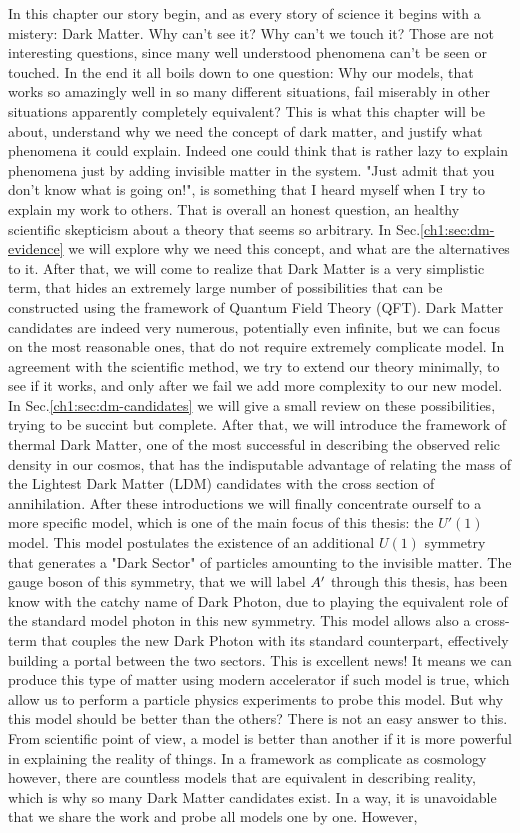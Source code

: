 In this chapter our story begin, and as every story of science it begins with a mistery: Dark Matter. Why can't see it? Why can't we touch it? Those are not interesting questions, since many well understood phenomena can't be seen or touched. In the end it all boils down to one question: Why our models, that works so amazingly well in so many different situations, fail miserably in other situations apparently completely equivalent? This is what this chapter will be about, understand why we need the concept of dark matter, and justify what phenomena it could explain. Indeed one could think that is rather lazy to explain phenomena just by adding invisible matter in the system. "Just admit that you don't know what is going on!", is something that I heard myself when I try to explain my work to others. That is overall an honest question, an healthy scientific skepticism  about a theory that seems so arbitrary. In Sec.\ref{ch1:sec:dm-evidence} we will explore why we need this concept, and what are the alternatives to it. After that, we will come to realize that Dark Matter is a very simplistic term, that hides an extremely large number of possibilities that can be constructed using the framework of Quantum Field Theory (QFT). Dark Matter candidates are indeed very numerous, potentially even infinite, but we can focus on the most reasonable ones, that do not require extremely complicate model. In agreement with the scientific method, we try to extend our theory minimally, to see if it works, and only after we fail we add more complexity to our new model. In Sec.\ref{ch1:sec:dm-candidates} we will give a small review on these possibilities, trying to be succint but complete. After that, we will introduce the framework of thermal Dark Matter, one of the most successful in describing the observed relic density in our cosmos, that has the indisputable advantage of relating the mass of the Lightest Dark Matter (LDM) candidates with the cross section of annihilation. After these introductions we will finally concentrate ourself to a more specific model, which is one of the main focus of this thesis: the $U'(1)$ model. This model postulates the existence of an additional $U(1)$ symmetry that generates a "Dark Sector" of particles amounting to the invisible matter. The gauge boson of this symmetry, that we will label $A'$ through this thesis, has been know with the catchy name of Dark Photon, due to playing the equivalent role of the standard model photon in this new symmetry. This model allows also a cross-term that couples the new Dark Photon with its standard counterpart, effectively building a portal between the two sectors. This is excellent news! It means we can produce this type of matter using modern accelerator if such model is true, which allow us to perform a particle physics experiments to probe this model. But why this model should be better than the others? There is not an easy answer to this. From scientific point of view, a model is better than another if it is more powerful in explaining the reality of things. In a framework as complicate as cosmology however, there are countless models that are equivalent in describing reality, which is why so many Dark Matter candidates exist. In a way, it is unavoidable that we share the work and probe all models one by one. However, 
